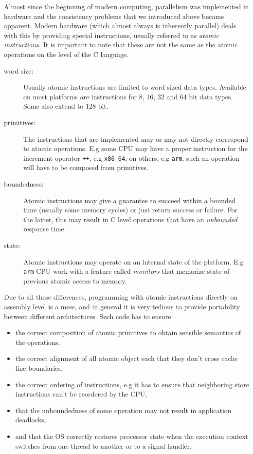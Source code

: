 Almost since the beginning of modern computing, parallelism was
implemented in hardware and the consistency problems that we
introduced above became apparent. Modern hardware (which almost
always is inherently parallel) deals with this by providing special
instructions, usually referred to as \emph{atomic instructions}. It is
important to note that these are not the same as the atomic
operations on the level of the C language.\itemadjust

\begin{description}
\item[{word size:}] Usually atomic instructions are limited to word
sized data types. Available on most platforms are
instructions for 8, 16, 32 and 64 bit
data types. Some also extend to 128 bit.\itemadjust
\item[{primitives:}] The instructions that are implemented may or may
not directly correspond to atomic operations. E.g
some CPU may have a proper instruction for the
increment operator \texttt{++}, e.g \texttt{x86\_64}, on others,
e.g \texttt{arm}, such an operation will have to be
composed from primitives.\itemadjust
\item[{boundedness:}] Atomic instructions may give a guarantee to
succeed within a bounded time (usually some
memory cycles) or just return success or
failure. For the latter, this may result in C
level operations that have an \emph{unbounded}
response time.\itemadjust
\item[{state:}] Atomic instructions may operate on an internal state of
the platform. E.g \texttt{arm} CPU work with a feature called
\emph{monitors} that memorize state of previous atomic
access to memory.\itemadjust
\end{description}

Due to all these differences, programming with atomic instructions
directly on assembly level is a mess, and in general it is very
tedious to provide portability between different
architectures. Such code has to ensure\itemadjust
\begin{itemize}
\item the correct composition of atomic primitives to obtain sensible
semantics of the operations,\itemadjust
\item the correct alignment of all atomic object such that they don't
cross cache line boundaries,\itemadjust
\item the correct ordering of instructions, e.g it has to ensure that
neighboring store instructions can't be reordered by the CPU,
\item that the unboundedness of some operation may not result in
application deadlocks,\itemadjust
\item and that the OS correctly restores processor state when the
execution context switches from one thread to another or to a
signal handler.
\end{itemize}


